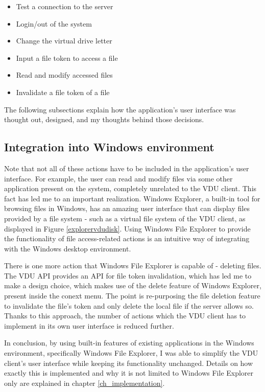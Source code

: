 \begin{itemize}
    \item Test a connection to the server
    \item Login/out of the system
    \item Change the virtual drive letter
    \item Input a file token to access a file
    \item Read and modify accessed files
    \item Invalidate a file token of a file
\end{itemize}

The following subsections explain how the application's user interface was thought out, designed, and my thoughts behind those decisions.

\subsection{Integration into Windows environment}

Note that not all of these actions have to be included in the application's user interface. For example, the user can read and modify files via some other application present on the system, completely unrelated to the VDU client. This fact has led me to an important realization. Windows Explorer, a built-in tool for browsing files in Windows, has an amazing user interface that can display files provided by a file system - such as a virtual file system of the VDU client, as displayed in Figure \ref{explorervdudisk}. 
Using Windows File Explorer to provide the functionality of file access-related actions is an intuitive way of integrating with the Windows desktop environment.

There is one more action that Windows File Explorer is capable of - deleting files. The VDU API provides an API for file token invalidation, which has led me to make a design choice, which makes use of the delete feature of Windows Explorer, present inside the conext menu. The point is re-purposing the file deletion feature to invalidate the file's token and only delete the local file if the server allows so. Thanks to this approach, the number of actions which the VDU client has to implement in its own user interface is reduced further.

In conclusion, by using built-in features of existing applications in the Windows environment, specifically Windows File Explorer, I was able to simplify the VDU client's user interface while keeping its functionality unchanged. Details on how exactly this is implemented and why it is not limited to Windows File Explorer only are explained in chapter \ref{ch_implementation}.


